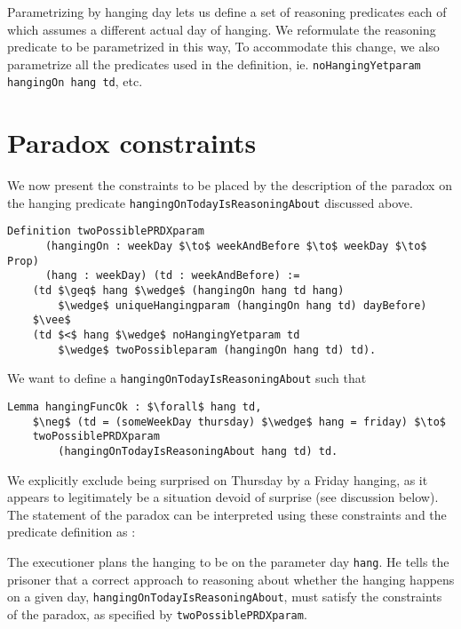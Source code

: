 \documentclass[runningheads]{llncs}
\newenvironment{myindent}{\begin{adjustwidth}{1cm}{}}{\end{adjustwidth}}
\begin{document}
Parametrizing by hanging day lets us define a set of reasoning predicates
each of which assumes a different actual day of hanging.
We reformulate the reasoning predicate to be parametrized in this way,
To accommodate this change, we also parametrize all
the predicates used in the definition, ie. {\tt noHangingYetparam hangingOn hang td}, etc.

\section{Paradox constraints}
\label{sec:constraints}

We now present the constraints to be placed by the description of the paradox on the
hanging predicate {\tt hangingOnTodayIsReasoningAbout} discussed above.

\begin{lstlisting}[mathescape=true]
  Definition twoPossiblePRDXparam
      (hangingOn : weekDay $\to$ weekAndBefore $\to$ weekDay $\to$ Prop)
      (hang : weekDay) (td : weekAndBefore) :=
    (td $\geq$ hang $\wedge$ (hangingOn hang td hang)
        $\wedge$ uniqueHangingparam (hangingOn hang td) dayBefore)
    $\vee$
    (td $<$ hang $\wedge$ noHangingYetparam td
        $\wedge$ twoPossibleparam (hangingOn hang td) td).
\end{lstlisting}

We want to define a {\tt hangingOnTodayIsReasoningAbout} such that

\begin{lstlisting}[mathescape=true]
Lemma hangingFuncOk : $\forall$ hang td,
    $\neg$ (td = (someWeekDay thursday) $\wedge$ hang = friday) $\to$
    twoPossiblePRDXparam
        (hangingOnTodayIsReasoningAbout hang td) td.
\end{lstlisting}

We explicitly exclude being surprised
on Thursday by a Friday hanging, as it appears to legitimately be a situation devoid
of surprise (see discussion below).
The statement of the paradox can be interpreted using these constraints and
the predicate definition as :

\begin{myindent}
  The executioner plans the hanging to be on the parameter
  day {\tt hang}. He tells the prisoner that a correct approach to reasoning about
  whether the hanging happens on a given day, {\tt hangingOnTodayIsReasoningAbout},
  must satisfy the constraints of the paradox, as specified by {\tt twoPossiblePRDXparam}.
\end{myindent}
\end{document}
